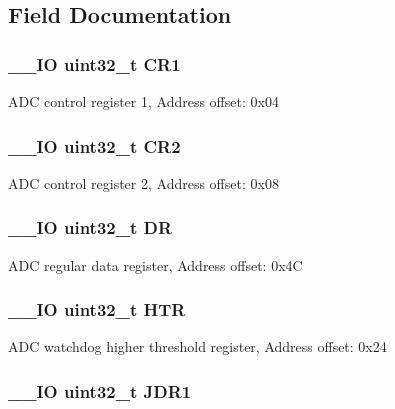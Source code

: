 \subsection{Field Documentation}
\hypertarget{struct_a_d_c___type_def_ab0ec7102960640751d44e92ddac994f0}{
\subsubsection[{C\-R1}]{\setlength{\rightskip}{0pt plus 5cm}\-\_\-\-\_\-\-I\-O uint32\-\_\-t C\-R1}}\label{struct_a_d_c___type_def_ab0ec7102960640751d44e92ddac994f0}
A\-D\-C control register 1, Address offset\-: 0x04 \hypertarget{struct_a_d_c___type_def_afdfa307571967afb1d97943e982b6586}{
\subsubsection[{C\-R2}]{\setlength{\rightskip}{0pt plus 5cm}\-\_\-\-\_\-\-I\-O uint32\-\_\-t C\-R2}}\label{struct_a_d_c___type_def_afdfa307571967afb1d97943e982b6586}
A\-D\-C control register 2, Address offset\-: 0x08 \hypertarget{struct_a_d_c___type_def_a3df0d8dfcd1ec958659ffe21eb64fa94}{
\subsubsection[{D\-R}]{\setlength{\rightskip}{0pt plus 5cm}\-\_\-\-\_\-\-I\-O uint32\-\_\-t D\-R}}\label{struct_a_d_c___type_def_a3df0d8dfcd1ec958659ffe21eb64fa94}
A\-D\-C regular data register, Address offset\-: 0x4\-C \hypertarget{struct_a_d_c___type_def_a24c3512abcc90ef75cf3e9145e5dbe9b}{
\subsubsection[{H\-T\-R}]{\setlength{\rightskip}{0pt plus 5cm}\-\_\-\-\_\-\-I\-O uint32\-\_\-t H\-T\-R}}\label{struct_a_d_c___type_def_a24c3512abcc90ef75cf3e9145e5dbe9b}
A\-D\-C watchdog higher threshold register, Address offset\-: 0x24 \hypertarget{struct_a_d_c___type_def_a22fa21352be442bd02f9c26a1013d598}{
\subsubsection[{J\-D\-R1}]{\setlength{\rightskip}{0pt plus 5cm}\-\_\-\-\_\-\-I\-O uint32\-\_\-t J\-D\-R1}}\label{struct_a_d_c___type_def_a22fa21352be442bd02f9c26a1013d598}
